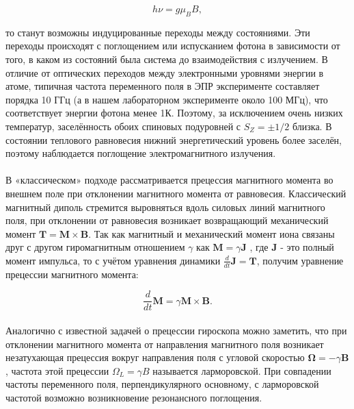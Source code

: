 \documentclass[a4paper,12pt]{article} %
\begin{document}
\begin{equation}
\label{e:2}
h \nu = g\mu_B B,
\end{equation} 

\noindent то станут возможны индуцированные переходы между состояниями. Эти переходы происходят с поглощением или испусканием фотона в зависимости от того, в каком из состояний была система до взаимодействия с излучением. В отличие от оптических переходов между электронными уровнями энергии в атоме, типичная частота переменного поля в ЭПР эксперименте составляет порядка 10 ГГц (а в нашем лабораторном эксперименте около 100 МГц), что соответствует энергии фотона менее 1К. Поэтому, за исключением очень низких температур, заселённость обоих спиновых подуровней с $S_Z = \pm 1/2$ близка. В состоянии теплового равновесия нижний энергетический уровень более заселён, поэтому наблюдается поглощение электромагнитного излучения.

\paragraph{}В «классическом» подходе рассматривается прецессия магнитного момента во внешнем поле при отклонении магнитного момента от равновесия. Классический магнитный диполь стремится выровняться вдоль силовых линий магнитного поля, при отклонении от равновесия возникает возвращающий механический момент $\mathbf{T} = \mathbf{M}\times \mathbf{B}$. Так как магнитный и механический момент иона связаны друг с другом гиромагнитным отношением $\gamma$ как $\mathbf{M}=\gamma \mathbf{J}$ , где $\mathbf{J}$ - это полный момент импульса, то с учётом уравнения динамики
$\frac{d}{dt}\mathbf{J} = \mathbf{T}$, получим уравнение прецессии магнитного момента:

\[
\dfrac{d}{dt}\mathbf{M} = \gamma \mathbf{M} \times \mathbf{B}.
\]
 
\paragraph{}Аналогично с известной задачей о прецессии гироскопа можно заметить, что при отклонении магнитного момента от направления магнитного поля возникает незатухающая прецессия вокруг направления поля с угловой скоростью $\boldsymbol{\Omega} = -\gamma \mathbf{B}$, частота этой прецессии $\Omega_L = \gamma B$ называется ларморовской. При совпадении частоты переменного поля, перпендикулярного основному, с ларморовской частотой возможно возникновение резонансного поглощения.
\end{document}
